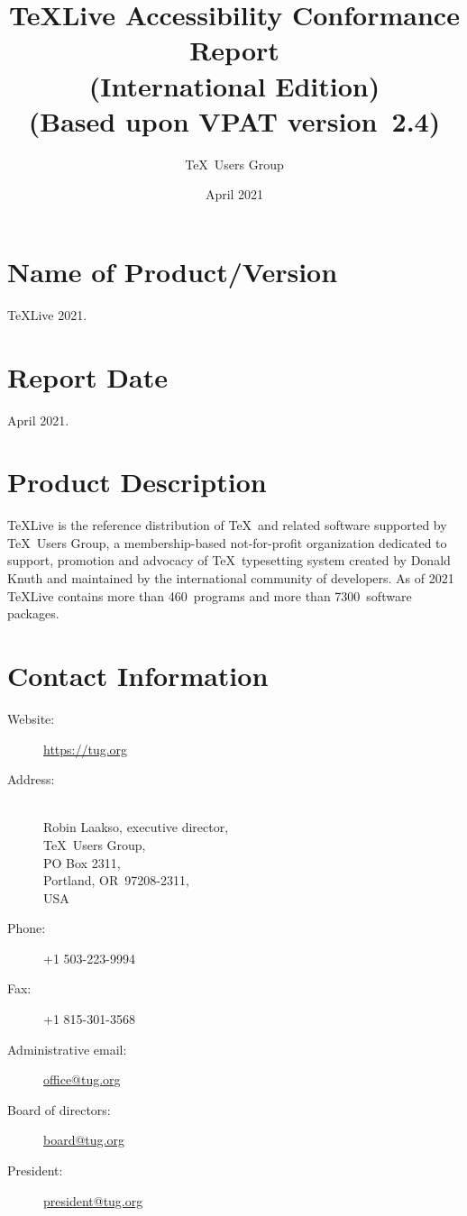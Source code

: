 \documentclass[a4paper]{report}
\begin{document}
\title{\TeX Live Accessibility Conformance Report\\
  (International Edition)\\
(Based upon VPAT\textsuperscript{\textregistered} version~2.4)}
\author{\TeX\ Users Group}
\date{April 2021}
\maketitle

\clearpage

\tableofcontents

\clearpage

\section{Name of Product/Version}
\label{sec:name}

\TeX Live 2021.


\section{Report Date}
\label{sec:date}

April 2021.


\section{Product Description}
\label{sec:description}

\TeX Live is the reference distribution of \TeX\ and related software
supported by \TeX\ Users Group, a membership-based not-for-profit
organization dedicated to support, promotion and advocacy of \TeX\
typesetting system created by Donald Knuth and maintained by the
international community of developers.  As of 2021 \TeX Live contains
more than 460~programs and more than 7300~software packages.

\section{Contact Information}
\label{sec:contact_info}

  \begin{description}
  \item[Website:]  \url{https://tug.org}
  \item[Address:] \leavevmode\\
    Robin Laakso, executive director,\\
    \TeX\ Users Group,\\
    PO Box 2311,\\
    Portland, OR~97208-2311,\\
    USA
  \item[Phone:] +1 503-223-9994
  \item[Fax:] +1 815-301-3568
  \item[Administrative email:] \href{mailto:office@tug.org}{office@tug.org}
  \item[Board of directors:] \href{mailto:board@tug.org}{board@tug.org}
  \item[President:] \href{mailto:president@tug.org}{president@tug.org}
  \end{description}
\end{document}
